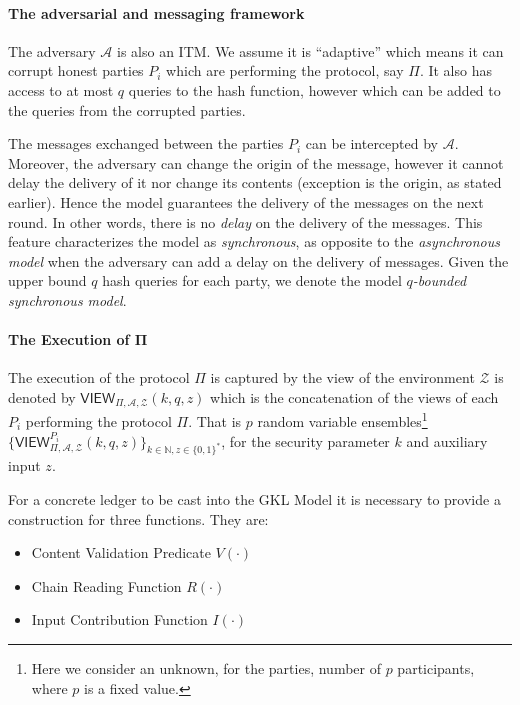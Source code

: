 \documentclass[conference,compsoc]{IEEEtran}
\begin{document}
\paragraph{\bf The adversarial and messaging framework} 
The adversary $\mathcal{A}$ is also an ITM. We assume it is ``adaptive'' which means it can corrupt honest parties $P_{i}$ which are performing the protocol, say  $\Pi$. It also has access to at most $q$ queries to the hash function, however which can be added to the queries from the corrupted parties. 

The messages exchanged between the parties $P_{i}$ can be intercepted by $\mathcal{A}$. Moreover, the adversary can change the origin of the message, however it cannot delay the delivery of it nor change its contents (exception is the origin, as stated earlier). Hence the model guarantees the delivery of the messages on the next round. In other words, there is no {\it delay} on the delivery of the messages. This feature characterizes the model as {\it synchronous}, as opposite to the {\it asynchronous model} when the adversary can add a delay on the delivery of messages. Given the  upper bound $q$ hash queries for each party, we denote the model $q${\it -bounded synchronous model}.

\paragraph{\bf The Execution of $\mathbf{\Pi}$}
The execution of the protocol $\Pi$ is captured by the view of the environment $\mathcal{Z}$ is denoted by $\mathsf{VIEW}_{\Pi,\mathcal{A},\mathcal{Z}}(k,q,z)$ which is the concatenation of the views of each  $P_{i}$ performing the protocol $\Pi$. That is $p$ random variable ensembles\footnote{Here we consider an unknown, for the parties, number of $p$ participants, where $p$ is a fixed value.} $\{\mathsf{VIEW}_{\Pi,\mathcal{A},\mathcal{Z}}^{P_{i}}(k,q,z)\}_{k\in\mathbb{N},z\in\{0,1\}^\ast}$, for the security parameter $k$ and auxiliary input $z$.

For a concrete ledger to be cast into the GKL Model it is necessary to provide a construction for three functions. They are:
\begin{itemize}
\item Content Validation Predicate  $V(\cdot)$
\item Chain Reading Function $R(\cdot)$
\item Input Contribution Function $I(\cdot)$
\end{itemize}
\end{document}
